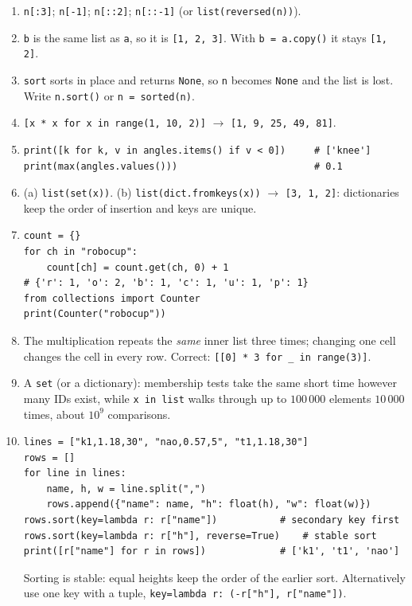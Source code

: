 \begin{enumerate}[label=\textbf{\ansnum.\arabic*}]
  \item \verb!n[:3]!; \verb!n[-1]!; \verb!n[::2]!; \verb!n[::-1]! (or \verb!list(reversed(n))!).
  \item \texttt{b} is the same list as \texttt{a}, so it is \texttt{[1, 2, 3]}. With \verb!b = a.copy()! it stays \texttt{[1, 2]}.
  \item \texttt{sort} sorts in place and returns \texttt{None}, so \texttt{n} becomes \texttt{None} and the list is lost. Write \verb!n.sort()! or \verb!n = sorted(n)!.
  \item \verb![x * x for x in range(1, 10, 2)]! $\to$ \texttt{[1, 9, 25, 49, 81]}.
  \item
\begin{verbatim}
print([k for k, v in angles.items() if v < 0])     # ['knee']
print(max(angles.values()))                        # 0.1
\end{verbatim}
  \item (a) \verb!list(set(x))!. (b) \verb!list(dict.fromkeys(x))! $\to$ \texttt{[3, 1, 2]}: dictionaries keep the order of insertion and keys are unique.
  \item
\begin{verbatim}
count = {}
for ch in "robocup":
    count[ch] = count.get(ch, 0) + 1
# {'r': 1, 'o': 2, 'b': 1, 'c': 1, 'u': 1, 'p': 1}
from collections import Counter
print(Counter("robocup"))
\end{verbatim}
  \item The multiplication repeats the \emph{same} inner list three times; changing one cell changes the cell in every row. Correct: \verb![[0] * 3 for _ in range(3)]!.
  \item A \texttt{set} (or a dictionary): membership tests take the same short time however many IDs exist, while \verb!x in list! walks through up to $100\,000$ elements $10\,000$ times, about $10^9$ comparisons.
  \item[\textbf{\ansnum.10}]
\begin{verbatim}
lines = ["k1,1.18,30", "nao,0.57,5", "t1,1.18,30"]
rows = []
for line in lines:
    name, h, w = line.split(",")
    rows.append({"name": name, "h": float(h), "w": float(w)})
rows.sort(key=lambda r: r["name"])           # secondary key first
rows.sort(key=lambda r: r["h"], reverse=True)    # stable sort
print([r["name"] for r in rows])             # ['k1', 't1', 'nao']
\end{verbatim}
  Sorting is stable: equal heights keep the order of the earlier sort. Alternatively use one key with a tuple, \verb!key=lambda r: (-r["h"], r["name"])!.
\end{enumerate}
